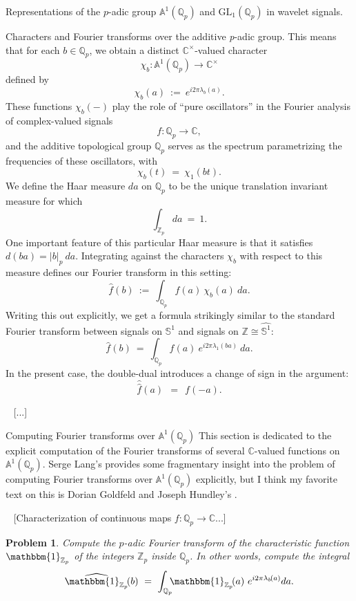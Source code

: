 \documentclass[letterpaper,11pt, reqno]{amsart}
\newtheorem{monodromy theorem}{Monodromy Theorem}[subsection]
\newtheorem{wild conjecture}[theorem]{Wild Conjecture}
\newtheorem{research objectives}{Research objectives}[subsection]
\newtheorem{research question}[theorem]{Research questions}
\newtheorem{aside question}[theorem]{Aside question}
\newtheorem{problem}[theorem]{Problem}
\newtheorem{audio example}[theorem]{\loudspeaker[3] Example}
\newtheorem{blank remark}[theorem]{}
\newtheorem{terminology and comment}[theorem]{Terminology and comment}
\newtheorem{purity hypothesis}[theorem]{Purity hypothesis}
\newtheorem{corollary of the purity hypothesis}[theorem]{Corollary of the purity hypothesis}
\newcommand{\CC} {{\mathbb C}}
\newcommand{\QQ} {{\mathbb Q}}
\newcommand{\ZZ} {{\mathbb Z}}
\newcommand{\lra}{{\longrightarrow}}
\numberwithin{equation}{theorem}
\begin{document}
\begin{section}{Representations of the $p$-adic group $\mathbb{A}^{\!1}(\mathbb{Q}_{p})$
and $\text{GL}_{1}(\mathbb{Q}_{p})$
in wavelet signals.}
\begin{subsection}{Characters and Fourier transforms over the additive {\em p}-adic group.}
	This means that for each $b\in\QQ_{p}$, we obtain a distinct $\CC^\times$-valued character
	$$
	\chi_{b}:\mathbb{A}^{\!1}(\QQ_{p})\lra\CC^\times
	$$
defined by
	$$
	\chi_{b}(a)
	\ :=\ 
	e^{i2\pi\lambda_{b}(a)}.
	$$
These functions $\chi_{b}(-)$ play the role of ``pure oscillators'' in the Fourier analysis of complex-valued signals
	$$
	f:\QQ_{p}\lra\CC,
	$$
and the additive topological group $\QQ_{p}$ serves as the spectrum parametrizing the frequencies of these oscillators, with
	$$
	\chi_{b}(t)
	\ =\ 
	\chi_{1}(bt).
	$$
We define the Haar measure $da$ on $\QQ_{p}$ to be the unique translation invariant measure for which
	$$
	\int_{\ZZ_{p}}\!\!\!\!da\ =\ 1.
	$$
One important feature of this particular Haar measure is that it satisfies $d(ba)=|b|_{p}\ da$. Integrating against the characters $\chi_{b}$ with respect to this measure defines our Fourier transform in this setting:
	$$
	\widehat{f}(b)
	\ :=\ 
	\int_{\QQ_{p}}\!\!\!f(a)\ \chi_{b}(a)\ da.
	$$
Writing this out explicitly, we get a formula strikingly similar to the standard Fourier transform between signals on $\mathbb{S}^{1}$ and signals on $\ZZ\cong\widehat{\mathbb{S}^{1}}$:
	$$
	\widehat{f}(b)
	\ =\ 
	\int_{\QQ_{p}}\!\!\!f(a)\ e^{i2\pi\lambda_{1}(ba)}\ da.
	$$
In the present case, the double-dual introduces a change of sign in the argument:
	$$
	\widehat{\text{$\!\!\widehat{f}$}}
	(a)
	\ \ =\ \ 
	f(-a).
	$$

\ 
{\color{red} [...]}

\end{subsection}

\begin{subsection}{Computing Fourier transforms over $\mathbb{A}^{\!1}(\QQ_{p})$}
This section is dedicated to the explicit computation of the Fourier transforms of several $\CC$-valued functions on $\mathbb{A}^{\!1}(\QQ_{p})$. Serge Lang's \cite[\S VII.1, pp. 92-93]{Lang} provides some fragmentary insight into the problem of computing Fourier transforms over $\mathbb{A}^{1}(\QQ_{p})$ explicitly, but I think my favorite text on this is Dorian Goldfeld and Joseph Hundley's \cite[\S\S 1.5-6, pp. 12-18]{GHv1}.

\ 
{\color{red} [Characterization of continuous maps $f:\QQ_{p}\lra\CC$...]}

\begin{problem}\label{problem: Fourier 1}
\normalfont
Compute the $p$-adic Fourier transform of the characteristic function $\mathbbm{1}_{\ZZ_p}$ of the integers $\ZZ_{p}$ inside $\QQ_{p}$. In other words, compute the integral
	$$\widehat{\mathbbm{1}_{\ZZ_{p}}}\!(b)
	\ =\ 
	\int_{\QQ_{p}}\!\!\!\mathbbm{1}_{\ZZ_{p}}\!(a)\ e^{i2\pi\lambda_{b\!}(a)}da.
	$$
\end{problem}


\end{subsection}
\end{section}
\end{document}
